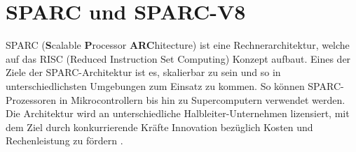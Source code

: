 








\section{SPARC und SPARC-V8}

SPARC (\textbf{S}calable \textbf{P}rocessor \textbf{ARC}hitecture) ist eine Rechnerarchitektur, welche auf das
RISC (Reduced Instruction Set Computing) Konzept aufbaut. Eines der Ziele der SPARC-Architektur ist es, skalierbar
zu sein und so in unterschiedlichsten Umgebungen zum Einsatz zu kommen. So können SPARC-Prozessoren in
Mikrocontrollern bis hin zu Supercomputern verwendet werden. Die Architektur wird an unterschiedliche
Halbleiter-Unternehmen lizensiert, mit dem Ziel durch konkurrierende Kräfte Innovation bezüglich Kosten und
Rechenleistung zu fördern \cite{sparc}.

